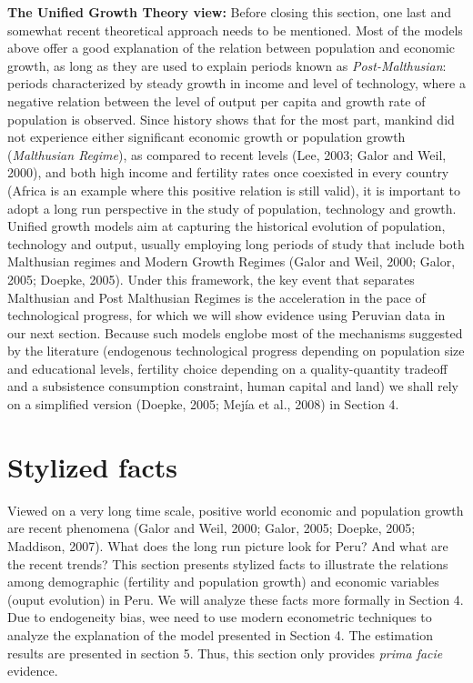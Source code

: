 \documentclass[12pt]{article}%
\begin{document}
\textbf{The Unified Growth Theory view:} Before closing this section, one last and somewhat recent theoretical approach needs to be mentioned. Most of the models above offer a good explanation of the relation between population and economic growth, as long as they are used to explain periods known as \emph{Post-Malthusian}: periods characterized by steady growth in income and level of technology, where a negative relation between the level of output per capita and growth rate of population is observed. Since history shows that for the most part, mankind did not experience either significant economic growth or population growth (\emph{Malthusian Regime}), as compared to recent levels (Lee, 2003; Galor and Weil, 2000), and both high income and fertility rates once coexisted in every country (Africa is an example where this positive relation is still valid), it is important to adopt a long run perspective in the study of population, technology and growth. Unified growth models aim at capturing the historical evolution of population, technology and output, usually employing long periods of study that include both Malthusian regimes and Modern Growth Regimes (Galor and Weil, 2000; Galor, 2005; Doepke, 2005). Under this framework, the key event that separates Malthusian and Post Malthusian Regimes is the acceleration in the pace of technological progress, for which we will show evidence using Peruvian data in our next section. Because such models englobe most of the mechanisms suggested by the literature (endogenous technological progress depending on population size and educational levels, fertility choice depending on a quality-quantity tradeoff and a subsistence consumption constraint, human capital and land) we shall rely on a simplified version (Doepke, 2005; Mej\'ia et al., 2008) in Section 4.
\section{Stylized facts}
Viewed on a very long time scale, positive world economic and population growth are recent phenomena (Galor and Weil, 2000; Galor, 2005; Doepke, 2005; Maddison, 2007). What does the long run picture look for Peru? And what are the recent trends? This section presents stylized facts to illustrate the relations among demographic (fertility and population growth) and economic variables (ouput evolution) in Peru. We will analyze these facts more formally in Section 4. Due to endogeneity bias, wee need to use modern econometric techniques to analyze the explanation of the model presented in Section 4. The estimation results are presented in section 5. Thus, this section only provides\emph{ prima facie }evidence.
\end{document}

